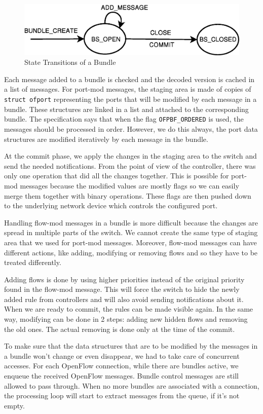 \begin{figure}[h]
\begin{center}
\includegraphics[scale=0.5]{src/img/bundle-state-machine.eps}
\end{center}
\caption{State Transitions of a Bundle}
\label{fig:bundle-state}
\end{figure}

Each message added to a bundle is checked and the decoded version is cached in a list of messages.
For port-mod messages, the staging area is made of copies of \texttt{struct ofport} representing the ports that
will be modified by each message in a bundle. These structures are linked in a list and attached to the corresponding bundle.
The specification says that when the flag \texttt{OFPBF_ORDERED} is used, the messages should be processed in order.
However, we do this always, the port data structures are modified iteratively by each message in the bundle.

At the commit phase, we apply the changes in the
staging area to the switch and send the needed notifications. From the point of view of the controller, there was only
one operation that did all the changes together. This is possible for port-mod messages because the modified values are mostly
flags so we can easily merge them together with binary operations. These flags are then pushed down to the underlying
network device which controls the configured port.

Handling flow-mod messages in a bundle is more difficult because the changes are spread in multiple parts of the switch.
We cannot create the same type of staging area that we used for port-mod messages. Moreover, flow-mod messages can have
different actions, like adding, modifying or removing flows and so they have to be treated differently.

Adding flows is done by using higher priorities instead of the original priority found in the flow-mod message. This
will force the switch to hide the newly added rule from controllers and will also avoid sending notifications about it.
When we are ready to commit, the rules can be made visible again. In the same way, modifying can be done in 2 steps:
adding new hidden flows and removing the old ones. The actual removing is done only at the time of the commit.

To make sure that the data structures that are to be modified by the messages in a bundle won't change or even disappear,
we had to take care of concurrent accesses. For each OpenFlow connection, while there are bundles active, we enqueue the
received OpenFlow messages. Bundle control messages are still allowed to pass through. When no more bundles are associated
with a connection, the processing loop will start to extract messages from the queue, if it's not empty.